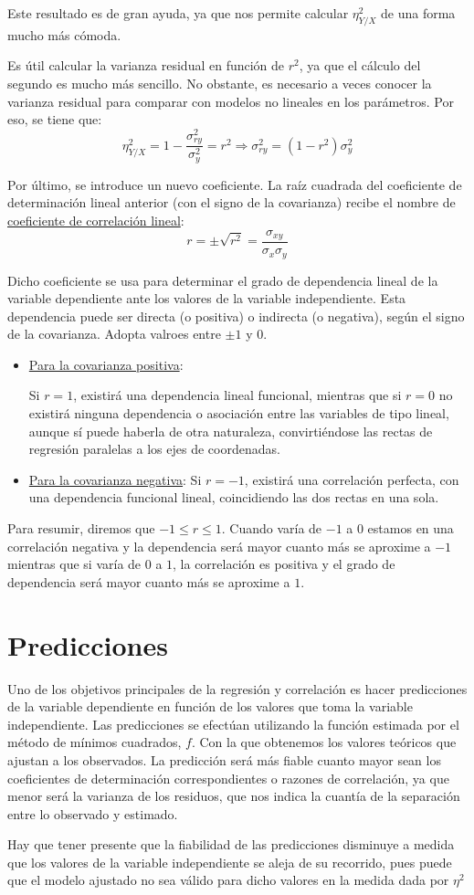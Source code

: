 Este resultado es de gran ayuda, ya que nos permite calcular $\eta_{Y/X}^2$ de una forma mucho más cómoda.

Es útil calcular la varianza residual en función de $r^2$, ya que el cálculo del segundo es mucho más sencillo. No obstante, es necesario a veces conocer la varianza residual para comparar con modelos no lineales en los parámetros. Por eso, se tiene que:
\begin{equation*}
    \eta_{Y/X}^2 = 1 - \dfrac{\sigma_{ry}^2}{\sigma_y^2}
    = r^2 \Longrightarrow \sigma_{ry}^2 = (1-r^2)\sigma_y^2
\end{equation*}


Por último, se introduce un nuevo coeficiente. La raíz cuadrada del coeficiente de determinación lineal anterior (con el signo de la covarianza) recibe el nombre
de \underline{coeficiente de correlación lineal}:
$$r = \pm \sqrt{r^2} = \dfrac{\sigma_{xy}}{\sigma_x \sigma_y}$$


Dicho coeficiente se usa para determinar el grado de dependencia lineal de la variable dependiente ante los valores
de la variable independiente. Esta dependencia puede ser directa (o positiva) o indirecta (o negativa), según
el signo de la covarianza. Adopta valroes entre $\pm1$ y 0.

\begin{itemize}
    \item \underline{Para la covarianza positiva}:

    Si $r=1$, existirá una dependencia lineal funcional, mientras que si $r=0$ no existirá ninguna dependencia o asociación entre las variables de tipo lineal, aunque sí puede haberla de otra naturaleza, convirtiéndose las rectas de regresión paralelas a los ejes de coordenadas.

    \item \underline{Para la covarianza negativa}:
    Si $r=-1$, existirá una correlación perfecta, con una dependencia funcional lineal, coincidiendo las dos rectas en una sola.
\end{itemize}

Para resumir, diremos que $-1 \leq r \leq 1$. Cuando varía de $-1$ a $0$ estamos en una correlación negativa y la dependencia
será mayor cuanto más se aproxime a $-1$ mientras que si varía de $0$ a $1$, la correlación es positiva y el grado de
dependencia será mayor cuanto más se aproxime a $1$.

\section{Predicciones}
Uno de los objetivos principales de la regresión y correlación es hacer predicciones de la variable dependiente en función de los valores que toma la variable independiente. Las predicciones se efectúan utilizando la función estimada por el método de mínimos cuadrados, $f$. Con la que obtenemos los valores teóricos que ajustan a los observados. La predicción será más fiable cuanto mayor sean los coeficientes de determinación correspondientes o razones de correlación, ya que menor será la varianza de los residuos, que nos indica la cuantía de la separación entre lo observado y estimado.

Hay que tener presente que la fiabilidad de las predicciones disminuye a medida que los valores de la variable independiente se aleja de su recorrido, pues puede que el modelo ajustado no sea válido para dicho valores en la medida dada por $\eta^2$